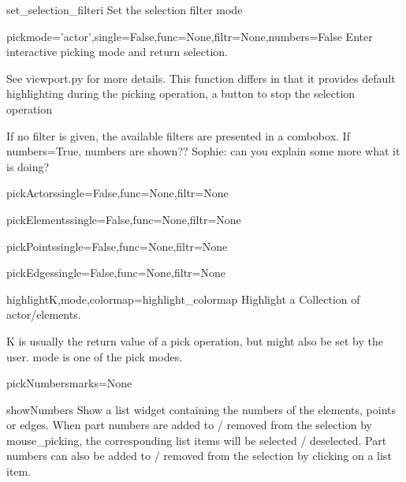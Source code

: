 \begin{funcdesc}{set_selection_filter}{i}
Set the selection filter mode
\end{funcdesc}

\begin{funcdesc}{pick}{mode='actor',single=False,func=None,filtr=None,numbers=False}
Enter interactive picking mode and return selection.

See viewport.py for more details.
This function differs in that it provides default highlighting
during the picking operation, a button to stop the selection operation

If no filter is given, the available filters are presented in a combobox.
If numbers=True, numbers are shown?? Sophie: can you explain some more
what it is doing?

\end{funcdesc}

\begin{funcdesc}{pickActors}{single=False,func=None,filtr=None}
\end{funcdesc}

\begin{funcdesc}{pickElements}{single=False,func=None,filtr=None}
\end{funcdesc}

\begin{funcdesc}{pickPoints}{single=False,func=None,filtr=None}
\end{funcdesc}

\begin{funcdesc}{pickEdges}{single=False,func=None,filtr=None}
\end{funcdesc}

\begin{funcdesc}{highlight}{K,mode,colormap=highlight_colormap}
Highlight a Collection of actor/elements.

K is usually the return value of a pick operation, but might also
be set by the user.
mode is one of the pick modes.

\end{funcdesc}

\begin{funcdesc}{pickNumbers}{marks=None}
\end{funcdesc}

\begin{funcdesc}{showNumbers}{}
Show a list widget containing the numbers of the elements,
points or edges. When part numbers are added to / removed from
the selection by mouse_picking, the corresponding list items will be
selected / deselected. Part numbers can also be added to / removed
from the selection by clicking on a list item.

\end{funcdesc}

